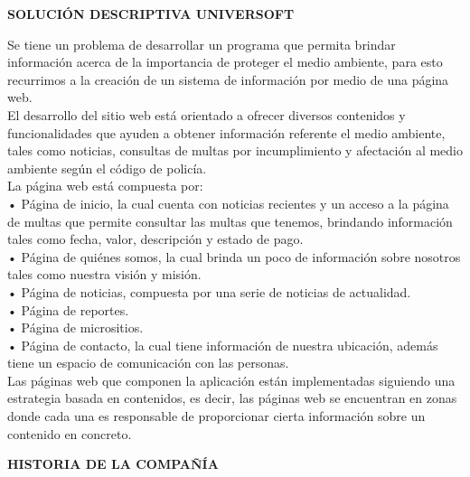 \documentclass[12pt]{article}
\begin{document}
\begin{center}
\textbf{\Large SOLUCIÓN DESCRIPTIVA UNIVERSOFT\\}
\end{center}
\large
{Se tiene un problema de desarrollar un programa que permita brindar información acerca de la importancia de proteger el medio ambiente, para esto recurrimos a la creación de un sistema de información por medio de una página web.\\
El desarrollo del sitio web está orientado a ofrecer diversos contenidos y funcionalidades que ayuden a obtener información referente el medio ambiente, tales como noticias, consultas de multas por incumplimiento y afectación al medio ambiente según el código de policía.\\

La página web está compuesta por:\\
•	Página de inicio, la cual cuenta con noticias recientes y un acceso a la página de multas que permite consultar las multas que tenemos, brindando información tales como fecha, valor, descripción y estado de pago.\\
•	Página de quiénes somos, la cual brinda un poco de información sobre nosotros tales como nuestra visión y misión.\\
•	Página de noticias, compuesta por una serie de noticias de actualidad.\\
•	Página de reportes. \\
•	Página de micrositios.\\
•	Página de contacto, la cual tiene información de nuestra ubicación, además tiene un espacio de comunicación con las personas.\\

Las páginas web que componen la aplicación están implementadas siguiendo una estrategia basada en contenidos, es decir, las páginas web se encuentran en zonas donde cada una es responsable de proporcionar cierta información sobre un contenido en concreto.


\begin{center}
\textbf{\Large HISTORIA DE LA COMPAÑÍA\\}
\end{center}

}
\end{document}
